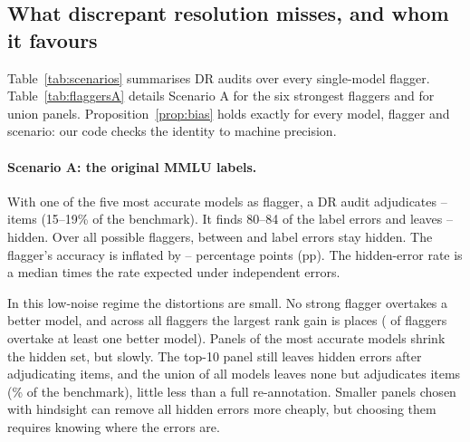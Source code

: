 \subsection{What discrepant resolution misses, and whom it favours}
\label{sec:emp-bias}

\begin{table}[t]
\centering
\scriptsize

\caption{DR audits over all single-model flaggers. ``Hidden $|J|$'' is the number of label errors the flagger reproduces, which therefore stay uncorrected. ``Flagger inflation'' is $\theta^\DR_f-\theta_f$, which equals $\Pn(J)$ (Corollary~\ref{cor:flagger}). ``Flaggers favoured'' counts the flaggers that DR ranks above at least one truly more accurate model. ``Max ranks gained'' is the largest rank improvement of a flagger. ``$P(J)$/indep.'' is the hidden-error rate divided by the rate expected if flagger and label erred independently (Section~\ref{sec:setup}).}
\label{tab:scenarios}
\end{table}

Table~\ref{tab:scenarios} summarises DR audits over every single-model flagger. Table~\ref{tab:flaggersA} details Scenario A for the six strongest flaggers and for union panels. Proposition~\ref{prop:bias} holds exactly for every model, flagger and scenario: our code checks the identity to machine precision.

\paragraph{Scenario A: the original MMLU labels.} With one of the five most accurate models as flagger, a DR audit adjudicates \adjTopFiveMinA--\adjTopFiveMaxA{} items (15--19\% of the benchmark). It finds 80--84 of the \nLabelErrA{} label errors and leaves \hiddenTopFiveMinA--\hiddenTopFiveMaxA{} hidden. Over all \nModels{} possible flaggers, between \hiddenMinA{} and \hiddenMaxA{} label errors stay hidden. The flagger's accuracy is inflated by \inflMinA--\inflMaxA{} percentage points (pp). The hidden-error rate is a median \indepRatioA{} times the rate expected under independent errors.

In this low-noise regime the distortions are small. No strong flagger overtakes a better model, and across all flaggers the largest rank gain is \rankGainA{} places (\favFlaggersA{} of \nModels{} flaggers overtake at least one better model). Panels of the most accurate models shrink the hidden set, but slowly. The top-10 panel still leaves \topTenHiddenA{} hidden errors after adjudicating \topTenAdjA{} items, and the union of all \nModels{} models leaves none but adjudicates \allPanelAdjA{} items (\allPanelAdjPctA\% of the benchmark), little less than a full re-annotation. Smaller panels chosen with hindsight can remove all hidden errors more cheaply, but choosing them requires knowing where the errors are.

